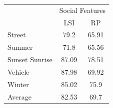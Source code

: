 \begin{table}[!ht]
 \hspace{1em}\vspace*{0.5cm}
 \begin{tabular}{|p{1.7cm}|c|c|}
  \hline
{\multirow{2}{*}{Labels}} & \multicolumn{2}{|c|}{Social Features} \\ \cline{2-3}
 & LSI & RP \\ \hline
Street & 79.2 & 65.91 \\  [1ex] \hline
Summer & 71.8 & 65.56 \\  [1ex] \hline
Sunset Sunrise & 87.09 & 78.51 \\  [1ex] \hline
Vehicle & 87.98 & 69.92 \\  [1ex] \hline
Winter & 85.02 & 75.9 \\  [1ex] \hline
Average & 82.53 & 69.7 \\  [1ex] \hline
\end{tabular}
 \label{ImageCLEFPrecisionSocialFeatures} %
\end{table}

